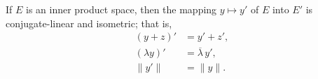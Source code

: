 If $E$ is an inner product space, then the mapping $y \mapsto y'$ of $E$ into $E'$ is conjugate-linear and isometric; that is,
\begin{align*}
(y + z)' &= y' + z', \\
(\lambda y)' &= \overline{\lambda} \, y', \\
\|y'\| &= \|y\|.
\end{align*}
